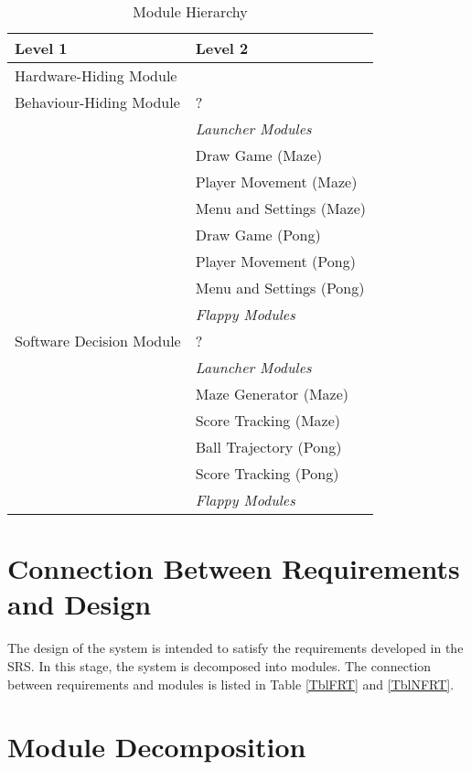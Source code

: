 \documentclass[12pt, titlepage]{article}
\begin{document}
\begin{table}[h!]
\centering
\begin{tabular}{p{} p{}}
\toprule
\textbf{Level 1} & \textbf{Level 2}\\
\midrule

{Hardware-Hiding Module} & ~ \\
\midrule

\multirow{1}{0.3\textwidth}{Behaviour-Hiding Module} & ?\\
& \textit{Launcher Modules}\\
& Draw Game (Maze)\\
& Player Movement (Maze)\\
& Menu and Settings (Maze)\\ 
& Draw Game (Pong)\\
& Player Movement (Pong)\\
& Menu and Settings (Pong)\\ 
& \textit{Flappy Modules}\\
\midrule

\multirow{1}{0.3\textwidth}{Software Decision Module} & {?}\\
& \textit{Launcher Modules}\\
& Maze Generator (Maze)\\
& Score Tracking (Maze)\\ 
& Ball Trajectory (Pong)\\
& Score Tracking (Pong) \\ 
& \textit{Flappy Modules}\\
\bottomrule

\end{tabular}
\caption{Module Hierarchy}
\label{TblMH}
\end{table}

\section{Connection Between Requirements and Design} \label{SecConnection}

The design of the system is intended to satisfy the requirements developed in
the SRS. In this stage, the system is decomposed into modules. The connection
between requirements and modules is listed in Table \ref{TblFRT} and \ref{TblNFRT}.

\section{Module Decomposition} \label{SecMD}
\end{document}
